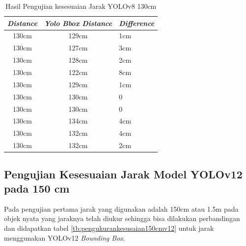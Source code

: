       \begin{table}[H]
        \centering
        \caption{Hasil Pengujian kesesuaian Jarak YOLOv8 130cm}
        \label{tb:pengukurankesusaian130cmv8}
        \begin{tabular}{|c|c|l|}
          \hline
          \textit{Distance} & \textit{Yolo Bbox Distance} & \textit{Difference} \\ \hline
          130cm             & 129cm                       & 1cm                 \\ \hline
          130cm             & 127cm                       & 3cm                 \\ \hline
          130cm             & 128cm                       & 2cm                 \\ \hline
          130cm             & 122cm                       & 8cm                 \\ \hline
          130cm             & 129cm                       & 1cm                 \\ \hline
          130cm             & 130cm                       & 0                   \\ \hline
          130cm             & 130cm                       & 0                   \\ \hline
          130cm             & 134cm                       & 4cm                 \\ \hline
          130cm             & 132cm                       & 4cm                 \\ \hline
          130cm             & 132cm                       & 2cm                 \\ \hline
          \end{tabular}
        \end{table}

\subsection{Pengujian Kesesuaian Jarak Model YOLOv12 pada 150 cm}
    
Pada pengujian pertama jarak yang digunakan adalah 150cm atau 1.5m pada objek nyata yang jaraknya telah diukur sehingga bisa dilakukan perbandingan dan didapatkan tabel \ref{tb:pengukurankesusaian150cmv12} untuk jarak menggunakan YOLOv12 \emph{Bounding Box}.

